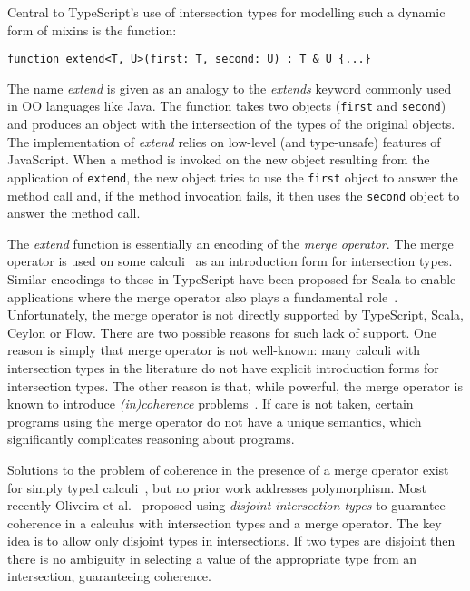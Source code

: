Central to TypeScript's use of intersection types for modelling such a
dynamic form of mixins is the function:

\begin{lstlisting}
function extend<T, U>(first: T, second: U) : T & U {...}
\end{lstlisting}

\noindent The name \emph{extend} is given as an analogy to the
\emph{extends} keyword commonly used in OO languages like Java.
The function takes two objects (\lstinline{first} and
\lstinline{second}) and produces an object with the intersection of
the types of the original objects. The implementation of
\emph{extend} relies on low-level (and type-unsafe) features of 
JavaScript. When a method is invoked on the new object resulting from 
the application of \lstinline{extend}, the new object tries to use the 
\lstinline{first} object to answer the method call and, if the method
invocation fails, it then uses the \lstinline{second} object to answer
the method call. 

The \emph{extend} function is essentially an encoding of the
\emph{merge operator}. The merge operator is used on some
calculi~\cite{reynolds1997design,reynolds1991coherence,Castagna92calculus,dunfield2014elaborating,oliveira16disjoint} as
an introduction form for intersection types. Similar encodings to
those in TypeScript have been proposed for Scala to enable
applications where the merge operator also plays a fundamental
role~\cite{oliveira2013feature,Rendel14OA}. 
Unfortunately, the merge operator is not directly
supported by TypeScript, Scala, Ceylon or Flow. There are two possible
reasons for such lack of support. One reason is simply that merge operator is
not well-known: many calculi with intersection types in the literature
do not have explicit introduction forms for intersection types. The
other reason is that, while powerful, the merge operator is known
to introduce \emph{(in)coherence} problems~\cite{reynolds1991coherence,dunfield2014elaborating}.  
If care is not
taken, certain programs using the merge operator do not have a unique
semantics, which significantly complicates reasoning about programs.

Solutions to the problem of coherence in the presence 
of a merge operator exist for simply typed
calculi~\cite{reynolds1997design,reynolds1991coherence,Castagna92calculus,oliveira16disjoint}, 
but no prior work addresses polymorphism. Most recently Oliveira
et al.~\cite{oliveira16disjoint} proposed using \emph{disjoint intersection types} to 
guarantee coherence in a calculus with intersection types and a merge 
operator. The key idea is to allow only disjoint types in
intersections. If two types are disjoint then there is no ambiguity in
selecting a value of the appropriate type from an intersection, 
guaranteeing coherence.

